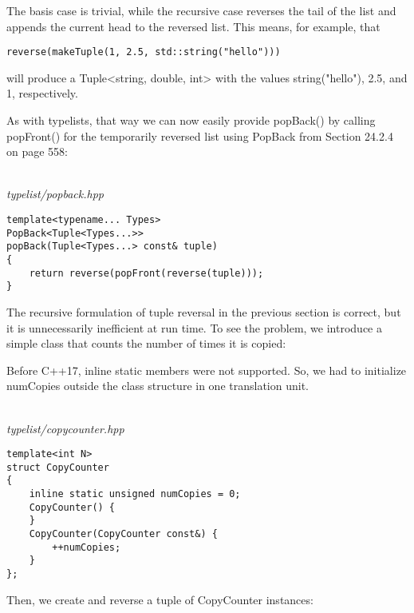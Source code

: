 The basis case is trivial, while the recursive case reverses the tail of the list and appends the current head to the reversed list. This means, for example, that

\begin{lstlisting}[style=styleCXX]
reverse(makeTuple(1, 2.5, std::string("hello")))
\end{lstlisting}

will produce a Tuple<string, double, int> with the values string("hello"), 2.5, and 1, respectively.

As with typelists, that way we can now easily provide popBack() by calling popFront() for the temporarily reversed list using PopBack from Section 24.2.4 on page 558:

\hspace*{\fill} \\ %
\noindent
\textit{typelist/popback.hpp}
\begin{lstlisting}[style=styleCXX]
template<typename... Types>
PopBack<Tuple<Types...>>
popBack(Tuple<Types...> const& tuple)
{
	return reverse(popFront(reverse(tuple)));
}
\end{lstlisting}


The recursive formulation of tuple reversal in the previous section is correct, but it is unnecessarily inefficient at run time. To see the problem, we introduce a simple class that counts the number of times it is copied:

\begin{tcolorbox}[colback=webgreen!5!white,colframe=webgreen!75!black]
\hspace*{0.75cm}Before C++17, inline static members were not supported. So, we had to initialize numCopies outside the class structure in one translation unit.
\end{tcolorbox}

\hspace*{\fill} \\ %
\noindent
\textit{typelist/copycounter.hpp}
\begin{lstlisting}[style=styleCXX]
template<int N>
struct CopyCounter
{
	inline static unsigned numCopies = 0;
	CopyCounter() {
	}
	CopyCounter(CopyCounter const&) {
		++numCopies;
	}
};
\end{lstlisting}

Then, we create and reverse a tuple of CopyCounter instances:

